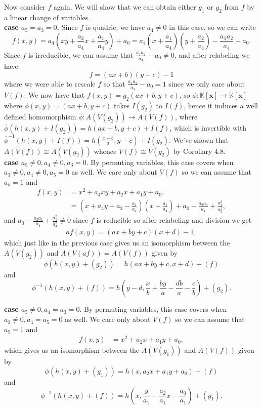 \documentclass{article}
\theoremstyle{definition}
\newcommand{\K}{\mathbb{K}}
\newcommand{\Kx}{\K[\bm{x}]}
\begin{document}
Now consider $f$ again. We will show that we can obtain either $g_1$ or $g_2$
from $f$ by a linear change of variables. \\ 

\textbf{case $a_5 = a_3 = 0$.} Since $f$ is quadric, we have $a_4 \not = 0$
in this case, so we can write
\[
	f(x, y) 
	=
	a_4 
	\left(
		xy
		+
		\frac{a_2}{a_4} x
		+
		\frac{a_1}{a_4} y
	\right)
	+
	a_0
	=
	a_4 
	\left(
		x
		+
		\frac{a_1}{a_4}
	\right)
	\left(
		y
		+
		\frac{a_2}{a_4}
	\right)
	-
	\frac{a_1a_2}{a_4}
	+
	a_0.
\] 
Since $f$ is irreducible, we can assume that $\frac{a_1a_2}{a_4} - a_0 \not =
0$, and after relabeling we have
\[
f = (ax + b)(y + c) - 1
\] 
where we were able to rescale $f$ so that $\frac{a_1a_2}{a_4} - a_0 = 1$ since
we only care about $V(f)$. We now have that $f(x, y) = g_2(ax + b, y + c)$, so
$\phi : \Kx \to \Kx$ where $\phi(x, y) = (ax + b, y + c)$ takes $I(g_2)$ to
$I(f)$, hence it induces a well defined homomorphism $\overline{\phi} :
A(V(g_2)) \to A(V(f))$, where $\overline{\phi}(h(x, y) + I(g_2)) = h(ax + b, y
+ c) + I(f)$, which is invertible with $\overline{\phi}^{-1}(h(x, y) + I(f)) =
h\left(\frac{x - b}{a}, y - c\right) + I(g_2)$. We've shown that $A(V(f)) \cong
A(V(g_2))$ whence $V(f) \cong V(g_2)$ by Corollary 4.8. \\

\textbf{case $a_5 \not = 0, a_4 \not = 0, a_3 = 0$}. By permuting variables,
this case covers when $a_3 \not = 0, a_4 \not = 0, a_5 = 0$ as well. We care
only about $V(f)$ so we can assume that $a_5 = 1$ and 
\begin{align*}
	f(x, y) 
	&= 
	x^{2} + a_4 xy + a_2 x + a_1 y + a_0. \\
	&= 
	\left(x + a_4y + a_2 - \frac{a_1}{a_4}\right)
	\left(x + \frac{a_1}{a_4}\right)
	+ a_0 - \frac{a_2a_1}{a_4} + \frac{a_1^{2}}{a_4^{2}},
\end{align*} 
and $a_0 - \frac{a_2a_1}{a_4} + \frac{a_1^{2}}{a_4^{2}} \not = 0$
since $f$ is reducible so after relabeling and division we get
\begin{align*}
	a f(x, y) 
	=
	\left(a x + b y + c\right)
	\left(x + d\right)
	- 1,
\end{align*} 
which just like in the previous case gives us an isomorphism between the $A(V(g_2))$ and $A(V(af)) = A(V(f))$
given by
\[
	\phi(h(x, y) + (g_2)) = h(ax + by + c, x + d) + (f)
\]
and 
\[
	\phi^{-1}(h(x, y) + (f)) = h\left(y - d, \frac{x}{b} + \frac{by}{a} - \frac{db}{a} - \frac{c}{b} \right) + (g_2).
\]


\textbf{case $a_5 \not = 0, a_4 = a_3 = 0$}. By permuting variables,
this case covers when $a_3 \not = 0, a_4 = a_5 = 0$ as well. We care
only about $V(f)$ so we can assume that $a_5 = 1$ and 
\begin{align*}
	f(x, y) 
	&= 
	x^{2} + a_2 x + a_1 y + a_0,
\end{align*} 
which gives us an isomorphism between the $A(V(g_1))$ and $A(V(f))$
given by
\[
	\phi(h(x, y) + (g_1)) = h(x, a_2 x + a_1 y + a_0) + (f)
\]
and 
\[
	\phi^{-1}(h(x, y) + (f)) = h\left(x, \frac{y}{a_1} - \frac{a_2}{a_1}x - \frac{a_0}{a_1}\right) + (g_1).
\]
\end{document}
